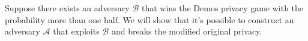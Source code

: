 \documentclass[12pt]{article}
\begin{document}
 
 Suppose there exists an adversary $\mathcal{B}$ that wins the Demos privacy game with the probability more than one half. We will show that it's possible to construct an adversary $\mathcal{A}$ that exploits $\mathcal{B}$ and breaks the modified original privacy. \\
\end{document}
